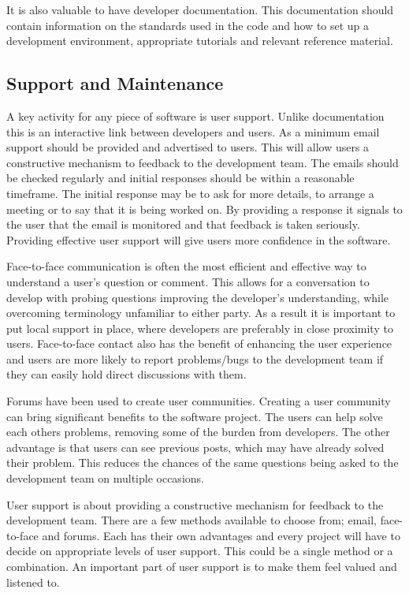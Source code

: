 \documentclass[jnr]{iosart2x}
\begin{document}
It is also valuable to have developer documentation.
This documentation should contain information on the standards used in the code and how to set up a development environment, appropriate tutorials and relevant reference material.

\subsection{Support and Maintenance}
\label{Support and Maintenance}

A key activity for any piece of software is user support.
Unlike documentation this is an interactive link between developers and users.
As a minimum email support should be provided and advertised to users.
This will allow users a constructive mechanism to feedback to the development team.
The emails should be checked regularly and initial responses should be within a reasonable timeframe.
The initial response may be to ask for more details, to arrange a meeting or to say that it is being worked on.
By providing a response it signals to the user that the email is monitored and that feedback is taken seriously. 
Providing effective user support will give users more confidence in the software.

Face-to-face communication is often the most efficient and effective way to understand a user's question or comment.
This allows for a conversation to develop with probing questions improving the developer's understanding, while overcoming terminology unfamiliar to either party.
As a result it is important to put local support in place, where developers are preferably in close proximity to users.
Face-to-face contact also has the benefit of enhancing the user experience and users are more likely to report problems/bugs to the development team if they can easily hold direct discussions with them.

Forums have been used to create user communities.
Creating a user community can bring significant benefits to the software project.
The users can help solve each others problems, removing some of the burden from developers.
The other advantage is that users can see previous posts, which may have already solved their problem.
This reduces the chances of the same questions being asked to the development team on multiple occasions.

User support is about providing a constructive mechanism for feedback to the development team.
There are a few methods available to choose from; email, face-to-face and forums.
Each has their own advantages and every project will have to decide on appropriate levels of user support.
This could be a single method or a combination.
An important part of user support is to make them feel valued and listened to.
\end{document}
